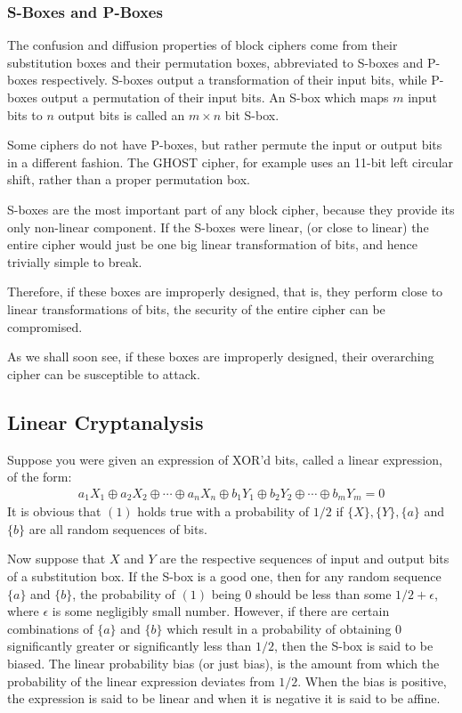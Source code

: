 \documentclass[12pt, a4paper, final]{report}
\begin{document}
\subsubsection{S-Boxes and P-Boxes}

The confusion and diffusion properties of block ciphers come from their
substitution boxes and their permutation boxes, abbreviated to S-boxes
and P-boxes respectively. S-boxes output a transformation of their input
bits, while P-boxes output a permutation of their input bits. An S-box
which maps $m$ input bits to $n$ output bits is called an $m \times n$ bit
S-box.

Some ciphers do not have P-boxes, but rather permute the input or output
bits in a different fashion. The GHOST cipher, for example uses an 11-bit
left circular shift, rather than a proper permutation box.

S-boxes are the most important part of any block cipher, because they
provide its only non-linear component. If the S-boxes were linear,
(or close to linear) the entire cipher would just be one big linear
transformation of bits, and hence trivially simple to break.

Therefore, if these boxes are improperly designed, that is, they perform
close to linear transformations of bits, the security of the entire
cipher can be compromised.

As we shall soon see, if these boxes are improperly designed, their overarching
cipher can be susceptible to attack.

\subsection{Linear Cryptanalysis}

Suppose you were given an expression of XOR'd bits, called a linear expression,
of the form:
\begin{align}
    a_1X_1 \oplus a_2X_2 \oplus \cdots \oplus a_nX_n \oplus
    b_1Y_1 \oplus b_2Y_2 \oplus \cdots \oplus b_mY_m = 0
\end{align}
It is obvious that $(1)$ holds true with a probability of $1/2$ if
$\{X\}, \{Y\}, \{a\}$ and $\{b\}$ are all random sequences of bits.

Now suppose that $X$ and $Y$ are the respective sequences of input and
output bits of a substitution box. If the S-box is a good one, then
for any random sequence $\{a\}$ and $\{b\}$, the probability of $(1)$
being $0$ should be less than some $1/2 + \epsilon$, where $\epsilon$ is
some negligibly small number. However, if
there are certain combinations of $\{a\}$ and $\{b\}$ which result in a
probability of obtaining $0$ significantly greater or significantly less than
$1/2$, then the S-box is said to be biased. The linear probability bias
(or just bias), is the amount from which the probability of the linear
expression deviates from $1/2$. When the bias is positive, the expression is
said to be linear and when it is negative it is said to be affine.
\end{document}
